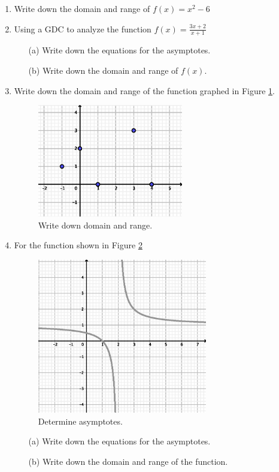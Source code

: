 \documentclass{article}
\begin{document}
\begin{enumerate}
\item Write down the domain and range of $f(x)= x^2-6$

\item Using a GDC to analyze the function $\displaystyle f(x)= \frac {3x+2}{x+1}$
\begin{itemize}
    \item[(a)] Write down the equations for the asymptotes.
	\item[(b)] Write down the domain and range of $f(x)$.
\end{itemize}

\newpage
\item Write down the domain and range of the function graphed in Figure \ref{domain}.

\begin{figure}[!ht]
    \centering
    \includegraphics[width=0.6\textwidth]{1-4_domain.eps}
    \caption{Write down domain and range. \label{domain}}
\end{figure}

\item For the function shown in Figure \ref{asymptote}
\begin{figure}[!bh]
    \centering
    \includegraphics[width=0.7\textwidth]{1-4_asymptotes.eps}
    \caption{Determine asymptotes. \label{asymptote}}
\end{figure}
\begin{itemize}
    \item[(a)] Write down the equations for the asymptotes.
	\item[(b)] Write down the domain and range of the function.
\end{itemize}


\end{enumerate}
\end{document}
